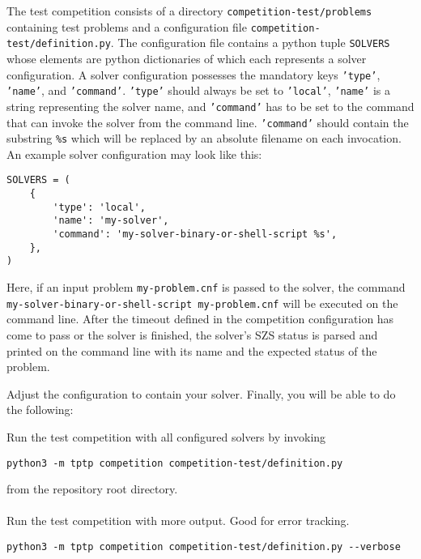 \documentclass[11pt,a4paper,english]{article}
\begin{document}
The test competition consists of a directory \texttt{competition-test/problems} containing test problems and
a configuration file \texttt{competition-test/definition.py}.
The configuration file contains a python tuple \texttt{SOLVERS} whose elements are python dictionaries of which
each represents a solver configuration.
A solver configuration possesses the mandatory keys \texttt{'type'}, \texttt{'name'}, and \texttt{'command'}.
\texttt{'type'} should always be set to \texttt{'local'}, \texttt{'name'} is a string representing the solver name,
and \texttt{'command'} has to be set to the command that can invoke the solver from the command line.
\texttt{'command'} should contain the substring \texttt{\%s} which will be replaced by an absolute filename
on each invocation. An example solver configuration may look like this:
\begin{Verbatim}
SOLVERS = (
    {
        'type': 'local',
        'name': 'my-solver',
        'command': 'my-solver-binary-or-shell-script %s',
    },
)
\end{Verbatim}
\begin{sloppypar}
Here, if an input problem \texttt{my-problem.cnf} is passed to the solver, the command
\texttt{my-solver-binary-or-shell-script my-problem.cnf} will be executed on the command line.
After the timeout defined in the competition configuration has come to pass or the solver is finished,
the solver's SZS status is parsed and printed on the command line with its name and the expected status of the problem.
\end{sloppypar}

Adjust the configuration to contain your solver. Finally, you will be able to do the following:

Run the test competition with all configured solvers by invoking
\begin{Verbatim}
python3 -m tptp competition competition-test/definition.py
\end{Verbatim}
from the repository root directory.
\\
\\
Run the test competition with more output. Good for error tracking.
\begin{Verbatim}
python3 -m tptp competition competition-test/definition.py --verbose
\end{Verbatim}
\end{document}
